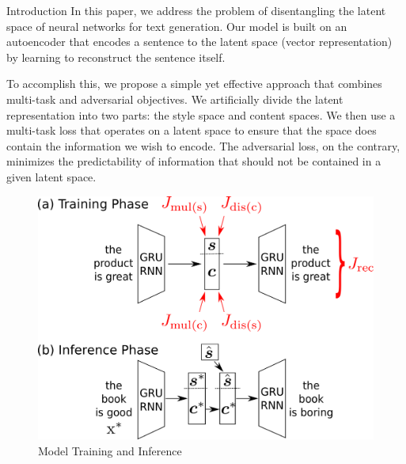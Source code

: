 \documentclass[final]{beamer}
\newlength{\onecolwid}
\begin{document}
\begin{frame}[t]
\begin{columns}[t]
\begin{column}{\onecolwid}
\begin{block}{Introduction}
                In this paper, we address the problem of disentangling the latent space of neural networks for text generation.
                Our model is built on an autoencoder that encodes a sentence to the latent space (vector representation) by learning to reconstruct the sentence itself.

                To accomplish this, we propose a simple yet effective approach that combines multi-task and adversarial objectives.
                We artificially divide the latent representation into two parts: the style space and content spaces.
                We then use a multi-task loss that operates on a latent space to ensure that the space does contain the information we wish to encode.
                The adversarial loss, on the contrary, minimizes the predictability of information that should not be contained in a given latent space.

            \end{block}


            \begin{figure}
                \includegraphics[width=1\linewidth]{model-overview}
                \caption{Model Training and Inference}
            \end{figure}


        \end{column} %


\end{columns}
\end{frame}
\end{document}
